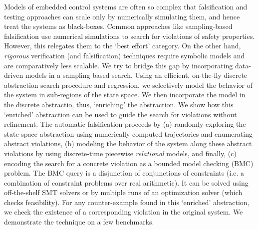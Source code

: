 Models of embedded control systems are often so complex that
falsification and testing approaches can scale only by numerically
simulating them, and hence treat the systems as black-boxes. Common
approaches like sampling-based falsification use numerical simulations
to search for violations of safety properties. However, this relegates
them to the `best effort' category. On the other hand, \emph{rigorous}
verification (and falsification) techniques require symbolic models
and are comparatively less scalable. We try to bridge this gap by
incorporating data-driven models in a sampling based search. Using an
efficient, on-the-fly discrete abstraction search procedure and
regression, we selectively model the behavior of the system in
sub-regions of the state space. We then incorporate the model in the
discrete abstractio, thus, `enriching' the abstraction. We show how
this `enriched' abstraction can be used to guide the search for
violations without refinement.  The automatic falsification proceeds
by (a) randomly exploring the state-space abstraction using
numerically computed trajectories and enumerating abstract violations,
(b) modeling the behavior of the system along these abstract
violations by using discrete-time piecewise \emph{relational} models,
and finally, (c) encoding the search for a concrete violation as a
bounded model checking (BMC) problem.  The BMC query is a disjunction
of conjunctions of constraints (i.e. a combination of constraint
problems over real arithmetic). It can be solved using off-the-shelf
SMT solvers or by multiple runs of an optimization solver (which
checks feasibility). For any counter-example found in this `enriched'
abstraction, we check the existence of a corresponding violation in
the original system. We demonstrate the technique on a few benchmarks.



